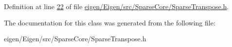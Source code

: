 Definition at line \hyperlink{eigen_2_eigen_2src_2_sparse_core_2_sparse_transpose_8h_source_l00022}{22} of file \hyperlink{eigen_2_eigen_2src_2_sparse_core_2_sparse_transpose_8h_source}{eigen/\+Eigen/src/\+Sparse\+Core/\+Sparse\+Transpose.\+h}.



The documentation for this class was generated from the following file\+:\begin{DoxyCompactItemize}
\item 
eigen/\+Eigen/src/\+Sparse\+Core/\+Sparse\+Transpose.\+h\end{DoxyCompactItemize}
